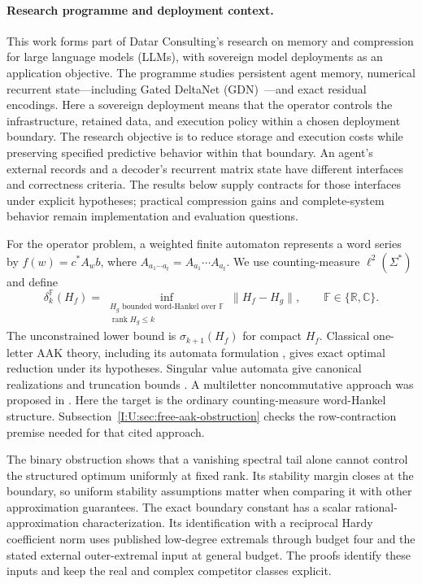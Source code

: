 \paragraph{Research programme and deployment context.}
This work forms part of Datar Consulting's research on memory and
compression for large language models (LLMs), with sovereign model
deployments as an application objective. The programme studies
persistent agent memory, numerical recurrent state---including Gated
DeltaNet (GDN)~\citep{yang2025gated}---and exact residual encodings.
Here a sovereign deployment means that the operator controls the
infrastructure, retained data, and execution policy within a chosen
deployment boundary. The research objective is to reduce storage and
execution costs while preserving specified predictive behavior within
that boundary. An agent's external records and a decoder's recurrent
matrix state have different interfaces and correctness criteria.
The results below supply contracts for those interfaces under explicit
hypotheses; practical compression gains and complete-system behavior
remain implementation and evaluation questions.

For the operator problem, a weighted finite automaton represents a word
series by $f(w)=c^*A_wb$, where
$A_{a_1\cdots a_t}=A_{a_1}\cdots A_{a_t}$.
We use counting-measure $\ell^2(\Sigma^*)$ and define
\[
 \delta_k^{\mathbb F}(H_f)=
 \inf_{\substack{H_g\text{ bounded word-Hankel over }\mathbb F\\
                  \operatorname{rank}H_g\le k}}
                  \|H_f-H_g\|,\qquad \mathbb F\in\{\mathbb R,\mathbb C\}.
\]
The unconstrained lower bound is $\sigma_{k+1}(H_f)$ for compact $H_f$.
Classical one-letter AAK theory, including its automata formulation
\citep{lacroce2024}, gives exact optimal reduction under its hypotheses.
Singular value automata give canonical realizations and truncation bounds
\citep{sva2019}. A multiletter noncommutative approach was proposed in
\citep{lacroce2022}. Here the target is the ordinary counting-measure
word-Hankel structure. Subsection~\ref{I:U:sec:free-aak-obstruction}
checks the row-contraction premise needed for that cited approach.

The binary obstruction shows that a vanishing spectral tail alone cannot
control the structured optimum uniformly at fixed rank. Its stability
margin closes at the boundary, so uniform stability assumptions matter
when comparing it with other approximation guarantees. The exact
boundary constant has a scalar rational-approximation characterization.
Its identification with a reciprocal Hardy coefficient norm uses
published low-degree extremals through budget four and the stated
external outer-extremal input at general budget. The proofs identify
these inputs and keep the real and complex competitor classes explicit.


